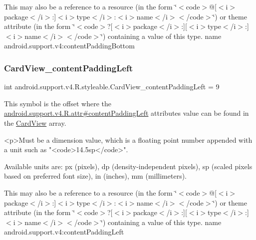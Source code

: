This may also be a reference to a resource (in the form \char`\"{}$<$code$>$@\mbox{[}$<$i$>$package$<$/i$>$\+:\mbox{]}$<$i$>$type$<$/i$>$\+:$<$i$>$name$<$/i$>$$<$/code$>$\char`\"{}) or theme attribute (in the form \char`\"{}$<$code$>$?\mbox{[}$<$i$>$package$<$/i$>$\+:\mbox{]}\mbox{[}$<$i$>$type$<$/i$>$\+:\mbox{]}$<$i$>$name$<$/i$>$$<$/code$>$\char`\"{}) containing a value of this type.  name android.\+support.\+v4\+:content\+Padding\+Bottom \mbox{\label{classandroid_1_1support_1_1v4_1_1R_1_1styleable_a198660da26d93adbeb9a7e86272310cd}} 
\subsubsection{\texorpdfstring{Card\+View\+\_\+content\+Padding\+Left}{CardView\_contentPaddingLeft}}
{\footnotesize\ttfamily int android.\+support.\+v4.\+R.\+styleable.\+Card\+View\+\_\+content\+Padding\+Left = 9\hspace{0.3cm}{\ttfamily [static]}}

This symbol is the offset where the \hyperlink{classandroid_1_1support_1_1v4_1_1R_1_1attr_a8968321b1f9c0babb9646f431ece6294}{android.\+support.\+v4.\+R.\+attr\#content\+Padding\+Left} attribute\textquotesingle{}s value can be found in the \hyperlink{classandroid_1_1support_1_1v4_1_1R_1_1styleable_a0e520cd4c78beb0d456e4018c4ba0e86}{Card\+View} array.

\begin{DoxyVerb}      <p>Must be a dimension value, which is a floating point number appended with a unit such as "<code>14.5sp</code>".
\end{DoxyVerb}
 Available units are\+: px (pixels), dp (density-\/independent pixels), sp (scaled pixels based on preferred font size), in (inches), mm (millimeters). 

This may also be a reference to a resource (in the form \char`\"{}$<$code$>$@\mbox{[}$<$i$>$package$<$/i$>$\+:\mbox{]}$<$i$>$type$<$/i$>$\+:$<$i$>$name$<$/i$>$$<$/code$>$\char`\"{}) or theme attribute (in the form \char`\"{}$<$code$>$?\mbox{[}$<$i$>$package$<$/i$>$\+:\mbox{]}\mbox{[}$<$i$>$type$<$/i$>$\+:\mbox{]}$<$i$>$name$<$/i$>$$<$/code$>$\char`\"{}) containing a value of this type.  name android.\+support.\+v4\+:content\+Padding\+Left \mbox{\label{classandroid_1_1support_1_1v4_1_1R_1_1styleable_ae19bc670fb53e513aa81d12cbd997100}} 
